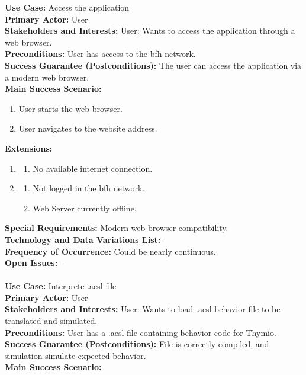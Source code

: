 \documentclass{scrreprt}
\begin{document}
\textbf{Use Case: }Access the application \\
\textbf{Primary Actor: }User \\
\textbf{Stakeholders and Interests: }User: Wants to access the application through a web browser. \\
\textbf{Preconditions: }User has access to the bfh network. \\
\textbf{Success Guarantee (Postconditions): }The user can access the application via a modern web browser. \\
\textbf{Main Success Scenario: } 
\begin{enumerate}
  \item User starts the web browser.
  \item User navigates to the website address.
\end{enumerate}
\textbf{Extensions: } 
\begin{enumerate}
  \item 
  \begin{enumerate}
    \item No available internet connection.
  \end{enumerate}
  \item 
  \begin{enumerate}
    \item Not logged in the bfh network.
    \item Web Server currently offline.
  \end{enumerate}
\end{enumerate}
\textbf{Special Requirements: }Modern web browser compatibility. \\
\textbf{Technology and Data Variations List: }- \\
\textbf{Frequency of Occurrence: }Could be nearly continuous.\\
\textbf{Open Issues: }- \\
\\
\textbf{Use Case: }Interprete .aesl file \\
\textbf{Primary Actor: }User \\
\textbf{Stakeholders and Interests: }User: Wants to load .aesl behavior file to be translated and simulated. \\
\textbf{Preconditions: }User has a .aesl file containing behavior code for Thymio. \\
\textbf{Success Guarantee (Postconditions): }File is correctly compiled, and simulation simulate expected behavior. \\
\textbf{Main Success Scenario: }
\end{document}
